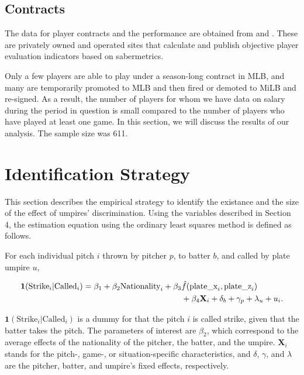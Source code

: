 \documentclass[dvipdfmx, 12pt]{jsarticle}
\begin{document}



\subsection{Contracts}

The data for player contracts and the performance are obtained from \citet{bbref} and \citet{fg}. These are privately owned and operated sites that calculate and publish objective player evaluation indicators based on sabermetrics. 

Only a few players are able to play under a season-long contract in MLB, and many are temporarily promoted to MLB and then fired or demoted to MiLB and re-signed. As a result, the number of players for whom we have data on salary during the period in question is small compared to the number of players who have played at least one game. In this section, we will discuss the results of our analysis. The sample size was 611.



\section{Identification Strategy}

This section describes the empirical strategy to identify the existance and the size of the effect of umpires' discrimination. Using the variables described in Section 4, the estimation equation using the ordinary least squares method is defined as follows.

For each individual pitch $i$ thrown by pitcher $p$, to batter $b$, and called by plate umpire $u$,

\begin{align}
  \mathbf{1}(\text{Strike}_i | \text{Called}_i) = 
  \beta_1 + \beta_2 \text{Nationality}_i + \beta_3 & \hat{f}(\text{plate\_x}_i, \text{plate\_z}_i) \notag \\
  &+ \beta_4 \mathbf{X}_{i} + \delta_b + \gamma_p + \lambda_{u} + u_i. \label{regression_main}
\end{align}

$\mathbf{1}(\text{Strike}_i | \text{Called}_i)$ is a dummy for that the pitch $i$ is called strike, given that the batter takes the pitch. The parameters of interest are $\beta_2$, which correspond to the average effects of the nationality of the pitcher, the batter, and the umpire. $\mathbf{X}_i$ stands for the pitch-, game-, or situation-specific characteristics, and $\delta$, $\gamma$, and $\lambda$ are the pitcher, batter, and umpire's fixed effects, respectively.
\end{document}
